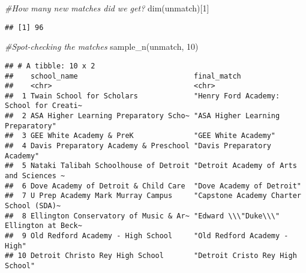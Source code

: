 \documentclass[
]{article}
\newenvironment{Shaded}{\begin{snugshade}}{\end{snugshade}}
\newcommand{\AttributeTok}[1]{\textcolor[rgb]{0.77,0.63,0.00}{#1}}
\newcommand{\CommentTok}[1]{\textcolor[rgb]{0.56,0.35,0.01}{\textit{#1}}}
\newcommand{\ConstantTok}[1]{\textcolor[rgb]{0.00,0.00,0.00}{#1}}
\newcommand{\DecValTok}[1]{\textcolor[rgb]{0.00,0.00,0.81}{#1}}
\newcommand{\FunctionTok}[1]{\textcolor[rgb]{0.00,0.00,0.00}{#1}}
\newcommand{\NormalTok}[1]{#1}
\newcommand{\OtherTok}[1]{\textcolor[rgb]{0.56,0.35,0.01}{#1}}
\newcommand{\SpecialCharTok}[1]{\textcolor[rgb]{0.00,0.00,0.00}{#1}}
\newcommand{\StringTok}[1]{\textcolor[rgb]{0.31,0.60,0.02}{#1}}
\begin{document}
\begin{Shaded}
\begin{Highlighting}[]
\CommentTok{\#How many new matches did we get?}
\FunctionTok{dim}\NormalTok{(unmatch)[}\DecValTok{1}\NormalTok{]}
\end{Highlighting}
\end{Shaded}

\begin{verbatim}
## [1] 96
\end{verbatim}

\begin{Shaded}
\begin{Highlighting}[]
\CommentTok{\#Spot{-}checking the matches}
\FunctionTok{sample\_n}\NormalTok{(unmatch, }\DecValTok{10}\NormalTok{)}
\end{Highlighting}
\end{Shaded}

\begin{verbatim}
## # A tibble: 10 x 2
##    school_name                           final_match                            
##    <chr>                                 <chr>                                  
##  1 Twain School for Scholars             "Henry Ford Academy: School for Creati~
##  2 ASA Higher Learning Preparatory Scho~ "ASA Higher Learning Preparatory"      
##  3 GEE White Academy & PreK              "GEE White Academy"                    
##  4 Davis Preparatory Academy & Preschool "Davis Preparatory Academy"            
##  5 Nataki Talibah Schoolhouse of Detroit "Detroit Academy of Arts and Sciences ~
##  6 Dove Academy of Detroit & Child Care  "Dove Academy of Detroit"              
##  7 U Prep Academy Mark Murray Campus     "Capstone Academy Charter School (SDA)~
##  8 Ellington Conservatory of Music & Ar~ "Edward \\\"Duke\\\" Ellington at Beck~
##  9 Old Redford Academy - High School     "Old Redford Academy - High"           
## 10 Detroit Christo Rey High School       "Detroit Cristo Rey High School"
\end{verbatim}

\begin{Shaded}
\end{Shaded}
\end{document}
